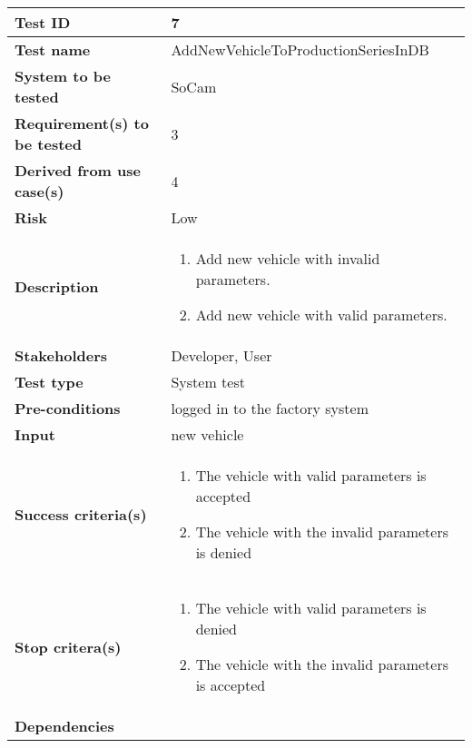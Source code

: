 				\begin{table}[H]
			\begin{tabular}{| p{4cm} | p{10cm} |}
			\hline
			\rowcolor{gray}
				{\bf Test ID} & 7 \\ \hline
				{\bf Test name} & AddNewVehicleToProductionSeriesInDB \\ \hline
				{\bf System to be tested} & SoCam \\ \hline
				{\bf Requirement(s) to be tested} & 3 \\ \hline
				{\bf Derived from use case(s)} & 4 \\ \hline
				{\bf Risk} & Low \\  \hline
				{\bf Description} & 
					\begin{enumerate}
						\item Add new vehicle with invalid parameters.
						\item Add new vehicle with valid parameters.
					\end{enumerate}
				\\ \hline
				{\bf Stakeholders} & Developer, User \\ \hline
				{\bf Test type} & System test \\ \hline
				{\bf Pre-conditions} & logged in to the factory system \\ \hline
				{\bf Input} & new vehicle \\ \hline
				{\bf Success criteria(s)} & 
					\begin{enumerate}
						\item The vehicle with valid parameters is accepted
						\item The vehicle with the invalid parameters is denied 
					\end{enumerate}
				\\ \hline
				{\bf Stop critera(s)} &  
					\begin{enumerate}
						\item The vehicle with valid parameters is denied 
						\item The vehicle with the invalid parameters is accepted
					\end{enumerate} \\ \hline
				{\bf Dependencies} & \\ \hline
			\end{tabular}
		\end{table}

	

